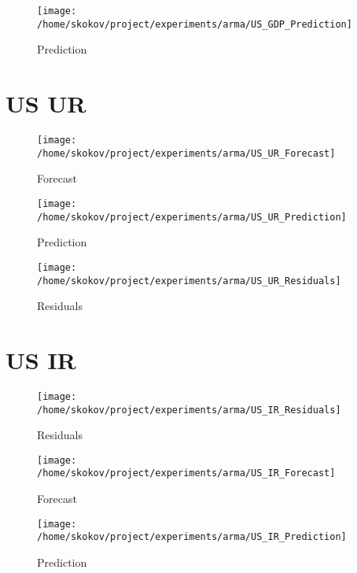 %


\begin{figure}[h!]%
\centering%
\texttt{[image: /home/skokov/project/experiments/arma/US\_GDP\_Prediction]}%
\caption{Prediction}%
\label{fig:US_GDP_Prediction}%
\end{figure}

%
\section{US UR}%


\begin{figure}[h!]%
\centering%
\texttt{[image: /home/skokov/project/experiments/arma/US\_UR\_Forecast]}%
\caption{Forecast}%
\label{fig:US_UR_Forecast}%
\end{figure}

%


\begin{figure}[h!]%
\centering%
\texttt{[image: /home/skokov/project/experiments/arma/US\_UR\_Prediction]}%
\caption{Prediction}%
\label{fig:US_UR_Prediction}%
\end{figure}

%


\begin{figure}[h!]%
\centering%
\texttt{[image: /home/skokov/project/experiments/arma/US\_UR\_Residuals]}%
\caption{Residuals}%
\label{fig:US_UR_Residuals}%
\end{figure}

%
\section{US IR}%


\begin{figure}[h!]%
\centering%
\texttt{[image: /home/skokov/project/experiments/arma/US\_IR\_Residuals]}%
\caption{Residuals}%
\label{fig:US_IR_Residuals}%
\end{figure}

%


\begin{figure}[h!]%
\centering%
\texttt{[image: /home/skokov/project/experiments/arma/US\_IR\_Forecast]}%
\caption{Forecast}%
\label{fig:US_IR_Forecast}%
\end{figure}

%


\begin{figure}[h!]%
\centering%
\texttt{[image: /home/skokov/project/experiments/arma/US\_IR\_Prediction]}%
\caption{Prediction}%
\label{fig:US_IR_Prediction}%
\end{figure}

